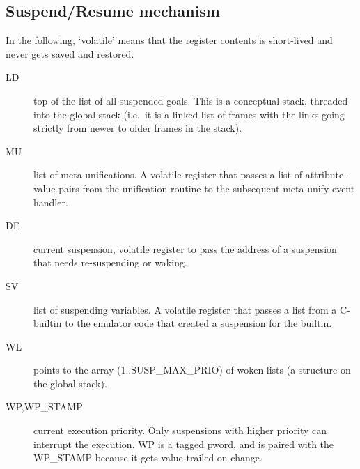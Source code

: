 \subsection{Suspend/Resume mechanism}
In the following, `volatile' means that the register contents is short-lived
and never gets saved and restored.
\begin{description}
\item[LD] top of the list of all suspended goals. This is a conceptual stack,
        threaded into the global stack (i.e.\ it is a linked list of frames
        with the links going strictly from newer to older frames in the stack).
\item[MU] list of meta-unifications. A volatile register that passes a list
        of attribute-value-pairs from the unification routine to the subsequent
        meta-unify event handler.
\item[DE] current suspension, volatile register to pass the address of
        a suspension that needs re-suspending or waking.
\item[SV] list of suspending variables. A volatile register that passes
        a list from a C-builtin to the emulator code that created a
        suspension for the builtin.
\item[WL] points to the array (1..SUSP_MAX_PRIO) of woken lists
        (a structure on the global stack).
\item[WP,WP_STAMP] current execution priority. Only suspensions with higher
        priority can interrupt the execution. WP is a tagged 
        pword, and is paired with the WP_STAMP because it gets
        value-trailed on change.
\end{description}


